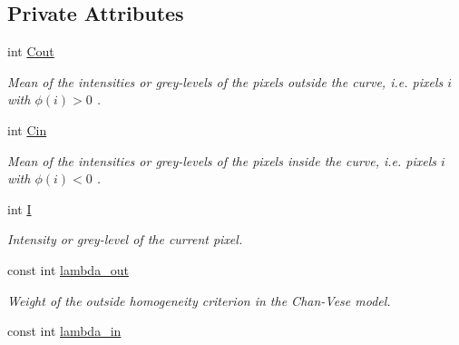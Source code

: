 \subsection*{Private Attributes}
\begin{DoxyCompactItemize}
\item 
\hypertarget{classofeli_1_1_a_cwithout_edges_a02c32b73dcc676251330a42b6fb4e6f4}{int \hyperlink{classofeli_1_1_a_cwithout_edges_a02c32b73dcc676251330a42b6fb4e6f4}{Cout}}\label{classofeli_1_1_a_cwithout_edges_a02c32b73dcc676251330a42b6fb4e6f4}

\begin{DoxyCompactList}\small\item\em Mean of the intensities or grey-\/levels of the pixels outside the curve, i.\-e. pixels $i$ with $\phi \left( i\right) >0$ . \end{DoxyCompactList}\item 
\hypertarget{classofeli_1_1_a_cwithout_edges_af26f696be73588b2a150c3eef6f62c85}{int \hyperlink{classofeli_1_1_a_cwithout_edges_af26f696be73588b2a150c3eef6f62c85}{Cin}}\label{classofeli_1_1_a_cwithout_edges_af26f696be73588b2a150c3eef6f62c85}

\begin{DoxyCompactList}\small\item\em Mean of the intensities or grey-\/levels of the pixels inside the curve, i.\-e. pixels $i$ with $\phi \left( i\right) <0$ . \end{DoxyCompactList}\item 
\hypertarget{classofeli_1_1_a_cwithout_edges_a5bac46e9934764b6055b781f2528324c}{int \hyperlink{classofeli_1_1_a_cwithout_edges_a5bac46e9934764b6055b781f2528324c}{I}}\label{classofeli_1_1_a_cwithout_edges_a5bac46e9934764b6055b781f2528324c}

\begin{DoxyCompactList}\small\item\em Intensity or grey-\/level of the current pixel. \end{DoxyCompactList}\item 
\hypertarget{classofeli_1_1_a_cwithout_edges_a94489baa2bd0a04b86020e61de55680d}{const int \hyperlink{classofeli_1_1_a_cwithout_edges_a94489baa2bd0a04b86020e61de55680d}{lambda\-\_\-out}}\label{classofeli_1_1_a_cwithout_edges_a94489baa2bd0a04b86020e61de55680d}

\begin{DoxyCompactList}\small\item\em Weight of the outside homogeneity criterion in the Chan-\/\-Vese model. \end{DoxyCompactList}\item 
\hypertarget{classofeli_1_1_a_cwithout_edges_a43a550a7ba56e0b0861d120e47c96d95}{const int \hyperlink{classofeli_1_1_a_cwithout_edges_a43a550a7ba56e0b0861d120e47c96d95}{lambda\-\_\-in}}\label{classofeli_1_1_a_cwithout_edges_a43a550a7ba56e0b0861d120e47c96d95}


\end{DoxyCompactItemize}
